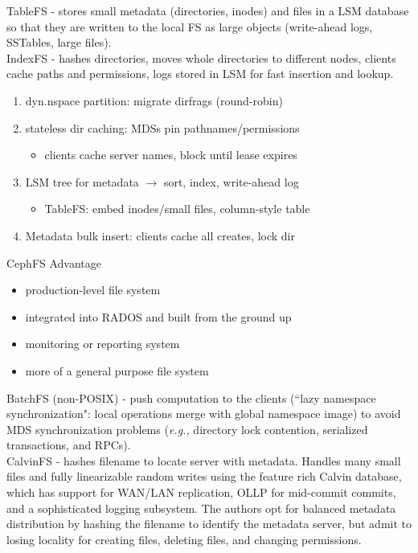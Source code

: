 \documentclass{article}
\begin{document}
\noindent\cite{ren:atc2013-tablefs} TableFS - stores small metadata (directories, inodes) and files in a LSM database so that they are written to the local FS as large objects (write-ahead logs, SSTables, large files). \\

\noindent\cite{ren:sc2014-indexfs} IndexFS - hashes directories, moves whole directories to different nodes, clients cache paths and permissions, logs stored in LSM for fast insertion and lookup. 

	\begin{enumerate}
		\item dyn.nspace partition: migrate dirfrags (round-robin)
		\item stateless dir caching: MDSs pin pathnames/permissions
		\begin{itemize}
			\item clients cache server names, block until lease expires
		\end{itemize}
		\item LSM tree for metadata \(\rightarrow\) sort, index, write-ahead log
		\begin{itemize}
			\item TableFS: embed inodes/small files, column-style table 
		\end{itemize}
		\item Metadata bulk insert: clients cache all creates, lock dir
	\end{enumerate}
	CephFS Advantage
	\begin{itemize}
		\item production-level file system
		\item integrated into RADOS and built from the ground up
		\item monitoring or reporting system
		\item more of a general purpose file system 
	\end{itemize}
	
\noindent\cite{zheng:pdsw2014-batchfs} BatchFS (non-POSIX) - push computation to the clients (``lazy namespace synchronization": local operations merge with global namespace image) to avoid MDS synchronization problems ({\it e.g.,} directory lock contention, serialized transactions, and RPCs).\\

\noindent\cite{thomson:fast2015-calvinfs} CalvinFS - hashes filename to locate server with metadata. Handles many small files and fully linearizable random writes using the feature rich Calvin database, which has support for WAN/LAN replication, OLLP for mid-commit commits, and a sophisticated logging subsystem. The authors opt for balanced metadata distribution by hashing the filename to identify the metadata server, but admit to losing locality for creating files, deleting files, and changing permissions.
\end{document}
